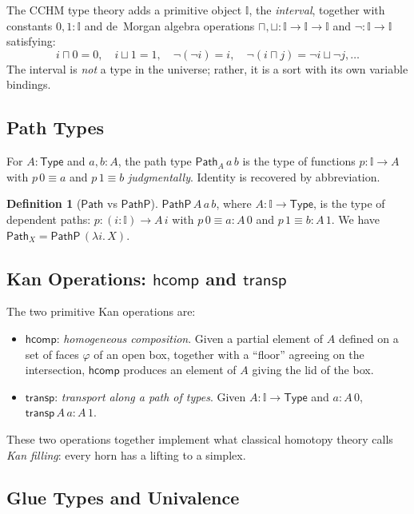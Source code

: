 \documentclass[12pt]{article}
\theoremstyle{definition}
\newtheorem{definition}[theorem]{Definition}
\theoremstyle{remark}
\newcommand{\Type}{\mathsf{Type}}
\newcommand{\Path}{\mathsf{Path}}
\newcommand{\PathP}{\mathsf{PathP}}
\newcommand{\II}{\mathbb{I}}
\newcommand{\hcomp}{\mathsf{hcomp}}
\newcommand{\transp}{\mathsf{transp}}
\begin{document}
The CCHM type theory adds a primitive object $\II$, the \emph{interval},
together with constants $0, 1 : \II$ and de~Morgan algebra operations
$\sqcap, \sqcup : \II \to \II \to \II$ and $\neg : \II \to \II$
satisfying:
\[
i \sqcap 0 = 0,\quad i \sqcup 1 = 1,\quad \neg(\neg i) = i,\quad
\neg(i \sqcap j) = \neg i \sqcup \neg j, \ldots
\]
The interval is \emph{not} a type in the universe; rather, it is a
sort with its own variable bindings.

\subsection{Path Types}

For $A : \Type$ and $a, b : A$, the path type $\Path_A\,a\,b$ is the type
of functions $p : \II \to A$ with $p\,0 \equiv a$ and $p\,1 \equiv b$
\emph{judgmentally}. Identity is recovered by abbreviation.

\begin{definition}[$\Path$ vs $\PathP$]
\label{def:path-pathp}
$\PathP\,A\,a\,b$, where $A : \II \to \Type$, is the type of dependent
paths: $p : (i : \II) \to A\,i$ with $p\,0 \equiv a : A\,0$ and
$p\,1 \equiv b : A\,1$. We have $\Path_X = \PathP\,(\lambda i.\,X)$.
\end{definition}

\subsection{\texorpdfstring{Kan Operations: $\hcomp$ and $\transp$}{Kan Operations: hcomp and transp}}

The two primitive Kan operations are:
\begin{itemize}
\item $\hcomp$: \emph{homogeneous composition}. Given a partial element
of $A$ defined on a set of faces $\varphi$ of an open box, together with a
``floor'' agreeing on the intersection, $\hcomp$ produces an element of
$A$ giving the lid of the box.
\item $\transp$: \emph{transport along a path of types}. Given
$A : \II \to \Type$ and $a : A\,0$, $\transp\,A\,a : A\,1$.
\end{itemize}

These two operations together implement what classical homotopy theory
calls \emph{Kan filling}: every horn has a lifting to a simplex.
\subsection{Glue Types and Univalence}
\end{document}
